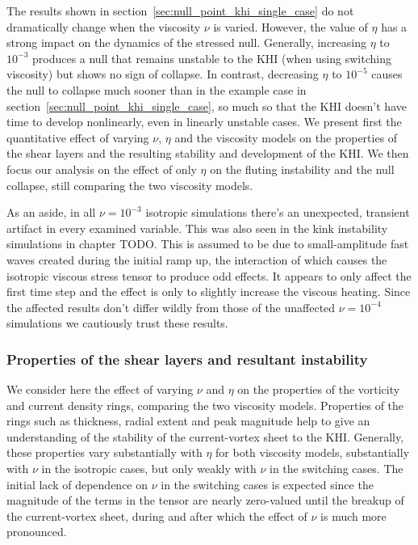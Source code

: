 The results shown in section~\ref{sec:null_point_khi_single_case} do not dramatically change when the viscosity $\nu$ is varied. However, the value of $\eta$ has a strong impact on the dynamics of the stressed null. Generally, increasing $\eta$ to $10^{-3}$ produces a null that remains unstable to the KHI (when using switching viscosity) but shows no sign of collapse. In contrast, decreasing $\eta$ to $10^{-5}$ causes the null to collapse much sooner than in the example case in section~\ref{sec:null_point_khi_single_case}, so much so that the KHI doesn't have time to develop nonlinearly, even in linearly unstable cases. We present first the quantitative effect of varying $\nu$, $\eta$ and the viscosity models on the properties of the shear layers and the resulting stability and development of the KHI. We then focus our analysis on the effect of only $\eta$ on the fluting instability and the null collapse, still comparing the two viscosity models.

As an aside, in all $\nu = 10^{-3}$ isotropic simulations there's an unexpected, transient artifact in every examined variable. This was also seen in the kink instability simulations in chapter TODO. This is assumed to be due to small-amplitude fast waves created during the initial ramp up, the interaction of which causes the isotropic viscous stress tensor to produce odd effects. It appears to only affect the first time step and the effect is only to slightly increase the viscous heating. Since the affected results don't differ wildly from those of the unaffected $\nu=10^{-4}$ simulations we cautiously trust these results.

\subsubsection{Properties of the shear layers and resultant instability}

We consider here the effect of varying $\nu$ and $\eta$ on the properties of the vorticity and current density rings, comparing the two viscosity models. Properties of the rings such as thickness, radial extent and peak magnitude help to give an understanding of the stability of the current-vortex sheet to the KHI. Generally, these properties vary substantially with $\eta$ for both viscosity models, substantially with $\nu$ in the isotropic cases, but only weakly with $\nu$ in the switching cases. The initial lack of dependence on $\nu$ in the switching cases is expected since the magnitude of the terms in the tensor are nearly zero-valued until the breakup of the current-vortex sheet, during and after which the effect of $\nu$ is much more pronounced.

